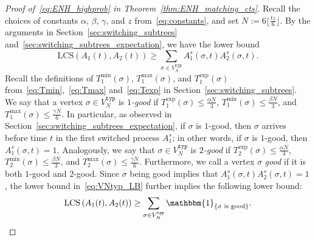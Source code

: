 \documentclass[11pt]{article}
\numberwithin{equation}{section}
\newcommand{\LCS}{\mathrm{LCS}} %
\theoremstyle{definition}
\begin{document}
\begin{proof}[Proof of~\eqref{eq:ENH_highprob} in Theorem~\ref{thm:ENH_matching_cts}] 
Recall the choices of constants 
$\alpha$, $\beta$, $\gamma$, and $z$ from~\eqref{eq:constants}, 
and set $N := 6 \lfloor \tfrac{tz}{6} \rfloor$. 
By the arguments in Section~\ref{sec:switching_subtrees} and~\ref{sec:switching_subtrees_expectation}, we have the lower bound 
\begin{equation}\label{eq:VNtyp_LB}
\LCS \left( A_{1}(t), A_{2}(t) \right) 
\geq 
\sum_{\sigma \in V_{N}^{\mathtt{typ}}} A_{1}^{s}(\sigma, t) A_{2}^{s}(\sigma, t).
\end{equation}
Recall the definitions of 
$T_{1}^{\min}(\sigma)$, $T_{1}^{\max}(\sigma)$, and $T_{1}^{\exp}(\sigma)$ from~\eqref{eq:Tmin},~\eqref{eq:Tmax} and~\eqref{eq:Texp}
in Section~\ref{sec:switching_subtrees}. 
We say that a vertex 
$\sigma \in V_{N}^{\mathtt{typ}}$ is \emph{$1$-good} 
if 
$T_{1}^{\exp}(\sigma) \leq \frac{\alpha N}{3}$, 
$T_{1}^{\min}(\sigma) \leq \frac{\beta N}{3}$, 
and $T_{1}^{\max}(\sigma) \leq \frac{\gamma N}{6}$. 
In particular, as observed in Section~\ref{sec:switching_subtrees_expectation}, 
if $\sigma$ is $1$-good, then $\sigma$ arrives before time $t$ in the first switched process $A_{1}^{s}$; 
in other words, if $\sigma$ is $1$-good, then $A_{1}^{s}(\sigma, t) = 1$. 
Analogously, we say that 
$\sigma \in V_{N}^{\mathtt{typ}}$ is \emph{$2$-good} 
if 
$T_{2}^{\exp}(\sigma) \leq \frac{\alpha N}{3}$, 
$T_{2}^{\min}(\sigma) \leq \frac{\beta N}{3}$, 
and $T_{2}^{\max}(\sigma) \leq \frac{\gamma N}{6}$. 
Furthermore, we call a vertex $\sigma$ \emph{good} 
if it is both $1$-good and $2$-good. 
Since $\sigma$ being good implies that 
$A_{1}^{s}(\sigma, t) A_{2}^{s}(\sigma, t) = 1$, 
the lower bound in~\eqref{eq:VNtyp_LB} further implies the following lower bound:
\begin{equation}\label{eq:VNtyp_good_LB}
\LCS \left( A_{1}(t), A_{2}(t) \right) 
\geq 
\sum_{\sigma \in V_{N}^{\mathtt{typ}}} 
\mathbbm{1}_{\left\{ \sigma \text{ is good} \right\}}.
\end{equation}


\end{proof}
\end{document}
